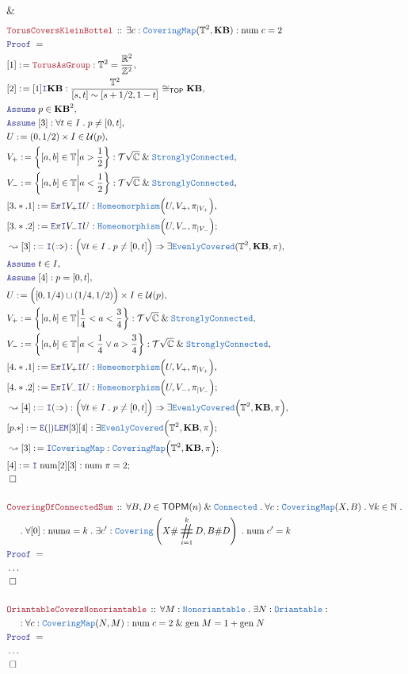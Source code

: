 \documentclass[12pt]{scrartcl}
\newcommand{\TYPE}[1]{\textcolor{NavyBlue}{\mathtt{#1}}}
\newcommand{\LOGIC}[1]{\textcolor{Blue}{\mathtt{#1}}}
\newcommand{\THM}[1]{\textcolor{Maroon}{\mathtt{#1}}}
\renewcommand{\.}{\; . \;}
\newcommand{\de}{: \kern 0.1pc =}
\newcommand{\Theorem}[2]{& \THM{#1} \, :: \, #2 \\ & \Proof = \\ }
\newcommand{\NewLine}{\\ & \kern 1pc}
\newcommand{\Page}[1]{ \begin{align*} #1 \end{align*}   }
\newcommand{\NoProof}{ & \ldots \\ \EndProof}
\renewcommand{\And}{\; \& \;}
\newcommand{\Imply}{\Rightarrow}
\newcommand{\Intro}{\LOGIC{I}}
\newcommand{\Elim}{\LOGIC{E}}
\newcommand{\Int}{\mathbb{Z} }
\newcommand{\Reals}{\mathbb{R} }
\newcommand{\Complex}{\mathbb{C}}
\newcommand{\Nat}{\mathbb{N} }
\newcommand{\Say}[3]{& #1 \de #2 : #3, \\}
\newcommand{\SayIn}[3]{& #1 \de #2 \in #3, \\}
\newcommand{\Conclude}[3]{& #1 \de #2 : #3; \\}
\newcommand{\Derive}[3]{& \leadsto #1 \de #2 : #3, \\}
\newcommand{\DeriveConclude}[3]{& \leadsto #1 \de #2 : #3 ; \\}
\newcommand{\Assume}[2]{& \LOGIC{Assume} \; #1 : #2, \\}
\newcommand{\AssumeIn}[2]{& \LOGIC{Assume} \; #1 \in #2, \\}
\newcommand{\QED}{\; \square}
\newcommand{\EndProof}{& \QED \\}
\newcommand{\Proof}{\LOGIC{Proof} \; }
\newcommand{\TOP}{\mathsf{TOP}}
\newcommand{\T}{\mathcal{T}}
\newcommand{\U}{\mathcal{U}}
\DeclareMathOperator{\bigsum}{\scalerel*{\#}{\sum}} %
\newcommand{\TOPM}{\mathsf{TOPM}}
\begin{document}
{	\EndProof
}\Page{
	\Theorem{TorusCoversKleinBottel}
	{
		\exists c : \TYPE{CoveringMap}(\mathbb{T}^2,\mathbf{KB}) : 
		\mathrm{num}\;c = 2
	}
	\Say{[1]}{\THM{TorusAsGroup}}
	{
		\mathbb{T}^2 = \frac{\Reals^2}{\Int^2}
	}
	\Say{[2]}{[1] \Intro \mathbf{KB}}{  \frac{\mathbb{T}^2}{ [s,t] \sim [s + 1/2,1-t]} \cong_\TOP \mathbf{KB}  }
	\AssumeIn{p}{\mathbf{KB}^2}
	\Assume{[3]}{\forall t \in I \. p \neq [0,t]}
	\SayIn{U}{(0,1/2) \times I }{\U(p)} 
	\Say{V_+}{\left\{ [a,b] \in \mathbb{T} \Big| a > \frac{1}{2} \right\}}{\T\sqrt{\Complex} \And \TYPE{StronglyConnected}}
	\Say{V_-}{\left\{ [a,b] \in \mathbb{T} \Big| a < \frac{1}{2} \right\}}{\T{\sqrt{\Complex}} \And \TYPE{StronglyConnected}}
	\Say{[3.*.1]}{\Elim \pi \Intro V_+ \Intro U}{\TYPE{Homeomorphism}\Big( U, V_+, \pi_{|V_+} \Big)}
	\Conclude{[3.*.2]}{\Elim \pi \Intro V_- \Intro U}{\TYPE{Homeomorphism}\Big( U, V_-, \pi_{|V_-} \Big)}
	\Derive{[3]}{\Intro(\Imply)}
	{
		\Big(\forall t \in I \. p \neq [0,t] \Big) 
		\Imply 
		\exists \TYPE{EvenlyCovered}(\mathbb{T}^2,\mathbf{KB},\pi) 
	}
	\AssumeIn{t}{I}
	\Assume{[4]}{p = [0,t]}
	\SayIn{U}{\Big([0,1/4)\sqcup (1/4,1/2) \Big) \times I }{\U(p)} 
	\Say{V_+}{\left\{ [a,b] \in \mathbb{T} \Big| \frac{1}{4} < a < \frac{3}{4} \right\}}
	{\T\sqrt{\Complex} \And \TYPE{StronglyConnected}}
	\Say{V_-}{\left\{ [a,b] \in \mathbb{T} \Big| a < \frac{1}{4} \vee a > \frac{3}{4} \right\}}
	{\T{\sqrt{\Complex}} \And \TYPE{StronglyConnected}}
	\Say{[4.*.1]}{\Elim \pi \Intro V_+ \Intro U}{\TYPE{Homeomorphism}\Big( U, V_+, \pi_{|V_+} \Big)}
	\Conclude{[4.*.2]}{\Elim \pi \Intro V_- \Intro U}{\TYPE{Homeomorphism}\Big( U, V_-, \pi_{|V_-} \Big)}
	\Derive{[4]}{\Intro(\Imply)}{
		\Big(\forall t \in I \. p \neq [0,t] \Big) \Imply 
		\exists \TYPE{EvenlyCovered}\Big(\mathbb{T}^2,\mathbf{KB},\pi\Big) 
	}
	\Conclude{[p.*]}{\Elim(|)\LOGIC{LEM}[3][4] }{\exists \TYPE{EvenlyCovered}\Big(\mathbb{T}^2,\mathbf{KB},\pi \Big)}
	\DeriveConclude{[3]}{\Intro \TYPE{CoveringMap}}{\TYPE{CoveringMap}\Big(\mathbb{T}^2,\mathbf{KB},\pi\Big)} 
	\Conclude{[4]}{\Intro\;\mathrm{num}[2][3]}
	{
		\mathrm{num}\;\pi = 2
	}
	\EndProof
	\\
	\Theorem{CoveringOfConnectedSum}
	{
		\forall B,D \in \TOPM(n) \And \TYPE{Connected} \.
		\forall c : \TYPE{CoveringMap}(X,B) \.
		\forall k \in \Nat \.\NewLine \.
		\forall [0] : \mathrm{num} a = k \.  
		\exists c' : \TYPE{Covering}\left( X \# \bigsum^k_{i=1} D , B \# D \right) \.
		\mathrm{num}\; c' = k
	}
	\NoProof
	\\
	\Theorem{OriantableCoversNonoriantable}
	{
		\forall M : \TYPE{Nonoriantable} \.
		\exists N : \TYPE{Oriantable} : \NewLine :
		\forall c : \TYPE{CoveringMap}(N,M) :
		\mathrm{num}\; c = 2
		\And
		\mathrm{gen}\; M = 1 + \mathrm{gen}\;N
	}
	\NoProof
}
\end{document}
